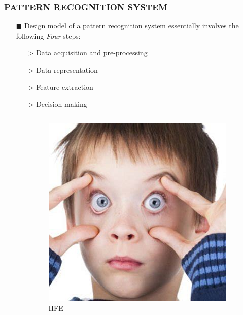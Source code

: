 \documentclass{beamer}
\begin{document}
\begin{frame}
\transsplitverticalin

\frametitle{PATTERN RECOGNITION SYSTEM}

\begin{itemize}
\item[$\blacksquare$]  Design model of a pattern recognition system essentially involves the following {\it Four} steps:-
\begin{itemize}
\item[\textgreater] Data acquisition and pre-processing
\item[\textgreater] Data representation
\item[\textgreater] Feature extraction
\item[\textgreater] Decision making
\begin{columns}
\begin{column}{.3\textwidth}
\begin{figure}
\includegraphics[width=\textwidth]{feye.jpg}
\caption {HFE}
\end{figure}
\pause
\end{column}


\end{columns}
\end{itemize}
\end{itemize}
\end{frame}
\end{document}
